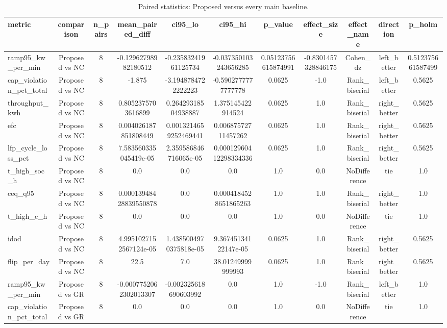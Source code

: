 \begin{table}[t]
\centering
\caption{Paired statistics: Proposed versus every main baseline.}
\label{tab:stats_all_auto}
\begin{tabular}{lcccccccccc}
\toprule
metric & comparison & n\_pairs & mean\_paired\_diff & ci95\_lo & ci95\_hi & p\_value & effect\_size & effect\_name & direction & p\_holm \\
\midrule
ramp95\_kw\_per\_min & Proposed vs NC & 8 & -0.12962798982180512 & -0.23583241961125734 & -0.037350103243656285 & 0.05123756615874991 & -0.8301457328846175 & Cohen\_dz & left\_better & 0.512375661587499 \\
cap\_violation\_pct\_total & Proposed vs NC & 8 & -1.875 & -3.1948784722222223 & -0.5902777777777778 & 0.0625 & -1.0 & Rank\_biserial & left\_better & 0.5625 \\
throughput\_kwh & Proposed vs NC & 8 & 0.8052375703616899 & 0.26429318504938887 & 1.375145422914524 & 0.0625 & 1.0 & Rank\_biserial & right\_better & 0.5625 \\
efc & Proposed vs NC & 8 & 0.004026187851808449 & 0.0013214659252469441 & 0.00687572711457262 & 0.0625 & 1.0 & Rank\_biserial & right\_better & 0.5625 \\
lfp\_cycle\_loss\_pct & Proposed vs NC & 8 & 7.583560335045419e-05 & 2.359586846716065e-05 & 0.00012960412298334336 & 0.0625 & 1.0 & Rank\_biserial & right\_better & 0.5625 \\
t\_high\_soc\_h & Proposed vs NC & 8 & 0.0 & 0.0 & 0.0 & 1.0 & 0.0 & NoDifference & tie & 1.0 \\
ceq\_q95 & Proposed vs NC & 8 & 0.00013948428839550878 & 0.0 & 0.0004184528651865263 & 1.0 & 1.0 & Rank\_biserial & right\_better & 1.0 \\
t\_high\_c\_h & Proposed vs NC & 8 & 0.0 & 0.0 & 0.0 & 1.0 & 0.0 & NoDifference & tie & 1.0 \\
idod & Proposed vs NC & 8 & 4.9951027152567124e-05 & 1.4385004970375818e-05 & 9.36745134122147e-05 & 0.0625 & 1.0 & Rank\_biserial & right\_better & 0.5625 \\
flip\_per\_day & Proposed vs NC & 8 & 22.5 & 7.0 & 38.01249999999993 & 0.0625 & 1.0 & Rank\_biserial & right\_better & 0.5625 \\
ramp95\_kw\_per\_min & Proposed vs GR & 8 & -0.0007752062302013307 & -0.002325618690603992 & 0.0 & 1.0 & -1.0 & Rank\_biserial & left\_better & 1.0 \\
cap\_violation\_pct\_total & Proposed vs GR & 8 & 0.0 & 0.0 & 0.0 & 1.0 & 0.0 & NoDifference & tie & 1.0 \\

\end{tabular}
\end{table}
